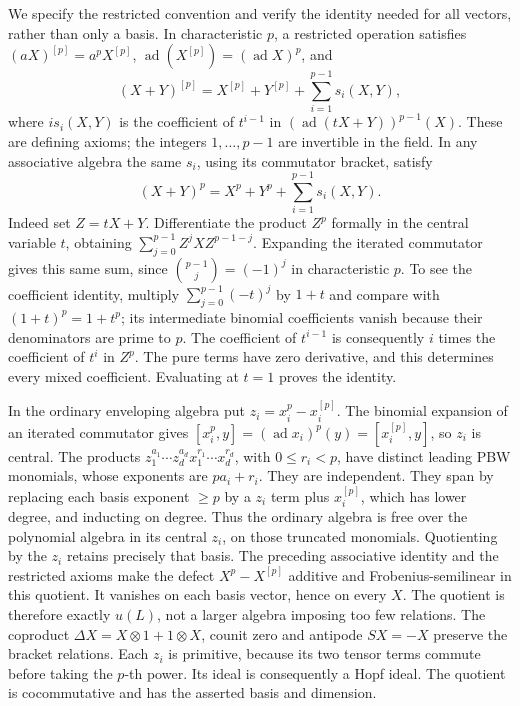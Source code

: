 \documentclass[11pt,a4paper,openany]{report}
\begin{document}
We specify the restricted convention and verify the identity needed for all vectors, rather than only a basis. In characteristic \(p\), a restricted operation satisfies \((aX)^{[p]}=a^pX^{[p]}\), \(\operatorname{ad}(X^{[p]})=(\operatorname{ad}X)^p\), and \[
 (X+Y)^{[p]}=X^{[p]}+Y^{[p]}+\sum_{i=1}^{p-1}s_i(X,Y),
\] where \(i s_i(X,Y)\) is the coefficient of \(t^{i-1}\) in \((\operatorname{ad}(tX+Y))^{p-1}(X)\). These are defining axioms; the integers \(1,\ldots,p-1\) are invertible in the field. In any associative algebra the same \(s_i\), using its commutator bracket, satisfy \[
 (X+Y)^p=X^p+Y^p+\sum_{i=1}^{p-1}s_i(X,Y).
\] Indeed set \(Z=tX+Y\). Differentiate the product \(Z^p\) formally in the central variable \(t\), obtaining \(\sum_{j=0}^{p-1}Z^jXZ^{p-1-j}\). Expanding the iterated commutator gives this same sum, since \(\binom{p-1}{j}=(-1)^j\) in characteristic \(p\). To see the coefficient identity, multiply \(\sum_{j=0}^{p-1}(-t)^j\) by \(1+t\) and compare with \((1+t)^p=1+t^p\); its intermediate binomial coefficients vanish because their denominators are prime to \(p\). The coefficient of \(t^{i-1}\) is consequently \(i\) times the coefficient of \(t^i\) in \(Z^p\). The pure terms have zero derivative, and this determines every mixed coefficient. Evaluating at \(t=1\) proves the identity.

In the ordinary enveloping algebra put \(z_i=x_i^p-x_i^{[p]}\). The binomial expansion of an iterated commutator gives \([x_i^p,y]=(\operatorname{ad}x_i)^p(y)=[x_i^{[p]},y]\), so \(z_i\) is central. The products \(z_1^{a_1}\cdots z_d^{a_d}x_1^{r_1}\cdots x_d^{r_d}\), with \(0\le r_i<p\), have distinct leading PBW monomials, whose exponents are \(pa_i+r_i\). They are independent. They span by replacing each basis exponent \(\ge p\) by a \(z_i\) term plus \(x_i^{[p]}\), which has lower degree, and inducting on degree. Thus the ordinary algebra is free over the polynomial algebra in its central \(z_i\), on those truncated monomials. Quotienting by the \(z_i\) retains precisely that basis. The preceding associative identity and the restricted axioms make the defect \(X^p-X^{[p]}\) additive and Frobenius-semilinear in this quotient. It vanishes on each basis vector, hence on every \(X\). The quotient is therefore exactly \(u(L)\), not a larger algebra imposing too few relations. The coproduct \(\Delta X=X\otimes1+1\otimes X\), counit zero and antipode \(SX=-X\) preserve the bracket relations. Each \(z_i\) is primitive, because its two tensor terms commute before taking the \(p\)-th power. Its ideal is consequently a Hopf ideal. The quotient is cocommutative and has the asserted basis and dimension.
\end{document}
